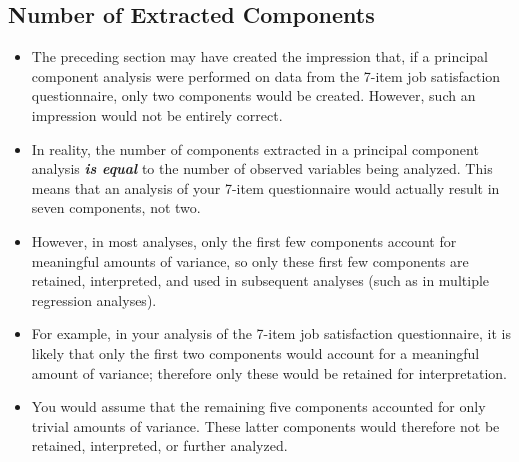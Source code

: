 \documentclass[]{article}
\begin{document}
\subsection{Number of Extracted Components}

\begin{itemize}
\item The preceding section may have created the impression
that, if a principal component analysis were performed on data from the 7-item job satisfaction
questionnaire, only two components would be created.  However, such an impression would not
be entirely correct.

\item In reality, the number of components extracted in a principal component analysis \textbf{\emph{is equal}} to the
number of observed variables being analyzed.  This means that an analysis of your 7-item
questionnaire would actually result in seven components, not two.

\item 
However, in most analyses, only the first few components account for meaningful amounts of
variance, so only these first few components are retained, interpreted, and used in subsequent
analyses (such as in multiple regression analyses).  
\item For example, in your analysis of the 7-item
job satisfaction questionnaire, it is likely that only the first two components would account for a
meaningful amount of variance; therefore only these would be retained for interpretation.  
\item You
would assume that the remaining five components accounted for only trivial amounts of
variance.  These latter components would therefore not be retained, interpreted, or further
analyzed.
\end{itemize}
\newpage
\end{document}
